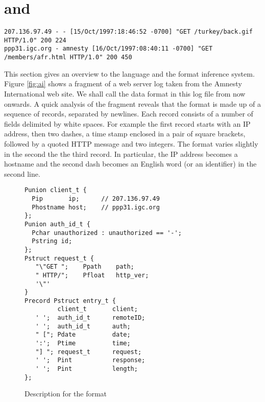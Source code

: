 \section{\pads{} and \learnpads{}} 
\label{sec:review}

\begin{figure*}[th]
{\small \begin{verbatim}
207.136.97.49 - - [15/Oct/1997:18:46:52 -0700] "GET /turkey/back.gif HTTP/1.0" 200 224
ppp31.igc.org - amnesty [16/Oct/1997:08:40:11 -0700] "GET /members/afr.html HTTP/1.0" 200 450
\end{verbatim}                  
}
\caption{A Fragment from a Web Server Log}\label{fig:ai}
\end{figure*}

This section gives an overview to the \pads{} language and the \learnpads{}
format inference system. Figure \ref{fig:ai} shows a fragment of a web server
log taken from the Amnesty International web site. We shall call the data format 
in this log file \ai{} from now onwards. A quick analysis of the fragment reveals
that the \ai{} format is made up of a sequence of records, separated by newlines.
Each record consists of a number of fields delimited by white spaces. For example
the first record starts with an IP address, then two dashes, a time stamp enclosed in
a pair of square brackets, followed by a quoted HTTP message and two integers.
The format varies slightly in the second the the third record. In particular,
the IP address becomes a hostname and the second dash becomes an English word 
(or an identifier) in the second line. 

\begin{figure}[th]
{\small \begin{verbatim}
Punion client_t {
  Pip       ip;      // 207.136.97.49
  Phostname host;    // ppp31.igc.org 
};
Punion auth_id_t {
  Pchar unauthorized : unauthorized == '-'; 
  Pstring id;                        
};
Pstruct request_t {
   "\"GET ";    Ppath    path;
   " HTTP/";    Pfloat   http_ver; 
   '\"'
}
Precord Pstruct entry_t {
         client_t       client;          
   ' ';  auth_id_t      remoteID;        
   ' ';  auth_id_t      auth;            
   " ["; Pdate          date;   
   ':';  Ptime          time;     
   "] "; request_t      request;         
   ' ';  Pint           response;     
   ' ';  Pint           length; 
};
\end{verbatim}
}
\caption{\padsc{} Description for the \ai{} format}
\label{fig:ai.p}
\end{figure}

